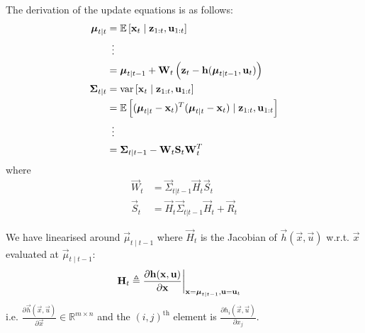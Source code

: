 The derivation of the update equations is as follows:
\begin{align}
	\vec \mu_{t \mid t}	&= \E\left[\vec x_t \mid \vec z_{1:t}, \vec u_{1:t}\right] \\
						&\,\,\,\vdots \\
						&= \vec \mu_{t \mid t - 1} + \vec W_t \left(\vec z_t - \vec h(\vec \mu_{t \mid t - 1}, \vec u_t)\right) \\
	\vec \Sigma_{t \mid t}	&= \var\left[\vec x_t \mid \vec z_{1:t}, \vec u_{1:t}\right] \\
							&= \E\left[(\vec \mu_{t \mid t} - \vec x_t)^T (\vec \mu_{t \mid t} - \vec x_t) \mid \vec z_{1:t}, \vec u_{1:t}\right] \\
							&\,\,\,\vdots \\
							&= \vec \Sigma_{t \mid t - 1} - \vec W_t \vec S_t \vec W_t^T
\end{align}
where
\begin{align}
	\vec W_t &= \vec \Sigma_{t | t - 1} \vec H_t \vec S_t \\
	\vec S_t &= \vec H_t \vec \Sigma_{t | t - 1} \vec H_t + \vec R_t
\end{align}

We have linearised around $\vec \mu_{t \mid t - 1}$ where $\vec H_t$ is the Jacobian of $\vec h(\vec x, \vec u)$ w.r.t. $\vec x$ evaluated at $\vec \mu_{t \mid t - 1}$:
\begin{align}
	\vec H_t	&\triangleq \frac{\partial \vec h(\vec x, \vec u)}{\partial \vec x}\at[\bigg]{\vec x = \vec \mu_{t \mid t - 1}, \vec u = \vec u_t}
\end{align}
i.e. $\frac{\partial \vec h(\vec x, \vec u)}{\partial \vec x} \in \mathbb R^{m \times n}$ and the $(i, j)^{\text{th}}$ element is $\frac{\partial h_i(\vec x, \vec u)}{\partial x_j}$.